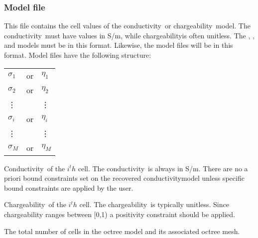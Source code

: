 \newcommand{\propertyOne}{conductivity}
\newcommand{\propertyOnecap}{Conductivity}
\newcommand{\propOneunits}{[S/m]}
\newcommand{\propOnegreek}{\sigma}
\newcommand{\propertyTwo}{chargeability}
\newcommand{\propertyTwocap}{Chargeability}
\newcommand{\propTwounits}{[unitless]}
\newcommand{\propTwogreek}{\eta}

\subsubsection{Model file}
This file contains the cell values of the \propertyOne ~or \propertyTwo ~model. The \propertyOne ~must have values in S/m, while \propertyTwo is often unitless. The , , and  models must be in this format. Likewise, the  model files will be in this format. Model files have the following structure:
\begin{fileExample}
\begin{tabular}{|lcl|}
\hline
$\propOnegreek_{1}$ & or & $\propTwogreek_{1}$ \\
$\propOnegreek_{2}$ & or & $\propTwogreek_{2}$ \\
\vdots & & \vdots \\
$\propOnegreek_{i}$ & or & $\propTwogreek_{i}$ \\
\vdots &  & \vdots \\
$\propOnegreek_{M}$ & or &$\propTwogreek_{M}$ \\
\hline
\end{tabular}
\end{fileExample}

\begin{description}[leftmargin=5cm, style=sameline, align=left]
\item[\codeName{$\propOnegreek_{i}$}] \propertyOnecap ~of the $i^th$ cell. The \propertyOne ~is always in S/m. There are no a priori bound constraints set on the recovered \propertyOne model unless specific bound constraints are applied by the user.
\item[\codeName{$\propTwogreek_{i}$}] \propertyTwocap ~of the $i^th$ cell. The \propertyTwo ~is typically unitless. Since chargeability ranges between [0,1) a positivity constraint should be applied.
\item[\codeName{$M$}] The total number of cells in the octree model and its associated octree mesh.
\end{description}